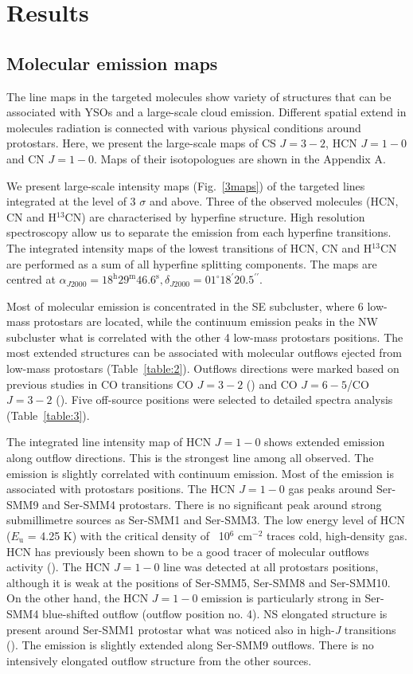 \documentclass{aa}
\begin{document}
\section{Results}
\subsection{Molecular emission maps}

The line maps in the targeted molecules show variety of structures that can be associated with YSOs and a large-scale cloud emission. Different spatial extend in molecules radiation is connected with various physical conditions around protostars. Here, we present the large-scale maps of CS $J=3-2$, HCN $J=1-0$ and CN $J=1-0$. Maps of their isotopologues are shown in the Appendix A. 

We present large-scale intensity maps (Fig.~\ref{3maps}) of the targeted lines integrated at the level of 3 $\sigma$ and above. Three of the observed molecules (HCN, CN and H$^{13}$CN) are characterised by hyperfine structure. High resolution spectroscopy allow us to separate the emission from each hyperfine transitions. The integrated intensity maps of the lowest transitions of HCN, CN and H$^{13}$CN are performed as a sum of all hyperfine splitting components. The maps are centred at $\alpha_{J2000} = 18^{\mathrm{h}} 29^{\mathrm{m}} 46.6^{\mathrm{s}}, \delta_{J2000} = 01^{\circ} 18^{\prime} 20.5 ^{\prime\prime}$.

Most of molecular emission is concentrated in the SE subcluster, where 6 low-mass protostars are located, while the continuum emission peaks in the NW subcluster  what is correlated with the other 4 low-mass protostars positions. The most extended structures can be associated with molecular outflows ejected from low-mass protostars (Table~\ref{table:2}). Outflows directions were marked based on previous studies in CO transitions CO $J=3-2$ (\citealt{Dio10}) and CO $J=6-5$/CO $J=3-2$ (\citealt{Yil15}). Five off-source positions were selected to detailed spectra analysis (Table~\ref{table:3}).  

The integrated line intensity map of HCN $J=1-0$ shows extended emission along outflow directions. This is the strongest line among all observed. The emission is slightly correlated with continuum emission. Most of the emission is associated with protostars positions. The HCN $J=1-0$ gas peaks around Ser-SMM9 and Ser-SMM4 protostars. There is no significant peak around strong submillimetre sources as Ser-SMM1 and Ser-SMM3. The low energy level of HCN ($E_\mathrm{u}$ = 4.25 K) with the critical density of ~10$^6$ cm$^{-2}$ traces cold, high-density gas. HCN has previously been shown to be a good tracer of molecular outflows activity (\citealt{Lee14}). The HCN $J=1-0$ line was detected at all protostars positions, although it is weak at the positions of Ser-SMM5, Ser-SMM8 and Ser-SMM10. On the other hand, the HCN $J=1-0$ emission is particularly strong in Ser-SMM4 blue-shifted outflow (outflow position no. 4). NS elongated structure is present around Ser-SMM1 protostar what was noticed also in high-\textit{J} transitions (\citealt{Yil15}). The emission is slightly extended along Ser-SMM9 outflows. There is no intensively elongated outflow structure from the other sources.
\end{document}
